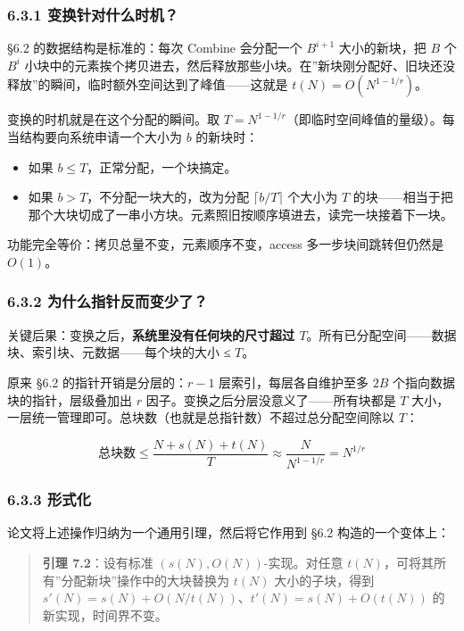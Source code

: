 \documentclass[
  UTF8,
  a4paper,
  12pt]{ctexart}
\providecommand{\tightlist}{%
  \setlength{\itemsep}{0pt}\setlength{\parskip}{0pt}}
\begin{document}
\subsubsection{6.3.1
变换针对什么时机？}\label{ux53d8ux6362ux9488ux5bf9ux4ec0ux4e48ux65f6ux673a}

§6.2 的数据结构是标准的：每次 Combine 会分配一个 \(B^{i+1}\)
大小的新块，把 \(B\) 个 \(B^i\)
小块中的元素挨个拷贝进去，然后释放那些小块。在''新块刚分配好、旧块还没释放''的瞬间，临时额外空间达到了峰值------这就是
\(t(N) = O(N^{1-1/r})\)。

变换的时机就是在这个分配的瞬间。取
\(T = N^{1-1/r}\)（即临时空间峰值的量级）。每当结构要向系统申请一个大小为
\(b\) 的新块时：

\begin{itemize}
\tightlist
\item
  如果 \(b \le T\)，正常分配，一个块搞定。
\item
  如果 \(b > T\)，不分配一块大的，改为分配 \(\lceil b / T \rceil\)
  个大小为 \(T\)
  的块------相当于把那个大块切成了一串小方块。元素照旧按顺序填进去，读完一块接着下一块。
\end{itemize}

功能完全等价：拷贝总量不变，元素顺序不变，access 多一步块间跳转但仍然是
\(O(1)\)。

\subsubsection{6.3.2
为什么指针反而变少了？}\label{ux4e3aux4ec0ux4e48ux6307ux9488ux53cdux800cux53d8ux5c11ux4e86}

关键后果：变换之后，\textbf{系统里没有任何块的尺寸超过
\(T\)}。所有已分配空间------数据块、索引块、元数据------每个块的大小 ≤
\(T\)。

原来 §6.2 的指针开销是分层的：\(r-1\) 层索引，每层各自维护至多 \(2B\)
个指向数据块的指针，层级叠加出 \(r\)
因子。变换之后分层没意义了------所有块都是 \(T\)
大小，一层统一管理即可。总块数（也就是总指针数）不超过总分配空间除以
\(T\)：

\[\text{总块数} \le \frac{N + s(N) + t(N)}{T} \approx \frac{N}{N^{1-1/r}} = N^{1/r}\]

\subsubsection{6.3.3 形式化}\label{ux5f62ux5f0fux5316}

论文将上述操作归纳为一个通用引理，然后将它作用到 §6.2 构造的一个变体上：

\begin{quote}
\textbf{引理 7.2}：设有标准 \((s(N), O(N))\)-实现。对任意
\(t(N)\)，可将其所有''分配新块''操作中的大块替换为 \(t(N)\)
大小的子块，得到
\(s'(N) = s(N) + O(N/t(N))\)、\(t'(N) = s(N) + O(t(N))\)
的新实现，时间界不变。
\end{quote}
\end{document}
